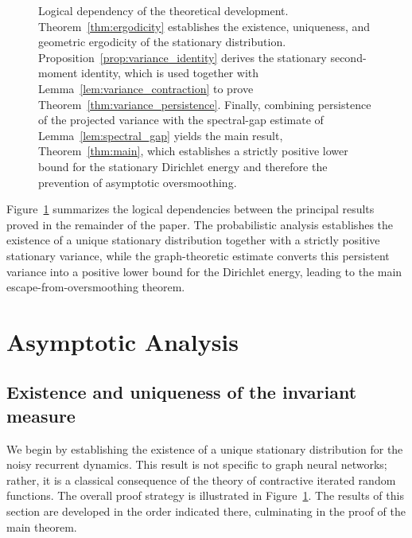 \documentclass{article}
\begin{document}
\begin{figure}
	\caption{
		Logical dependency of the theoretical development.
		Theorem~\ref{thm:ergodicity} establishes the existence, uniqueness, and
		geometric ergodicity of the stationary distribution.
		Proposition~\ref{prop:variance_identity} derives the stationary
		second-moment identity, which is used together with
		Lemma~\ref{lem:variance_contraction} to prove
		Theorem~\ref{thm:variance_persistence}.
		Finally, combining persistence of the projected variance with the
		spectral-gap estimate of
		Lemma~\ref{lem:spectral_gap}
		yields the main result,
		Theorem~\ref{thm:main}, which establishes a strictly positive lower bound
		for the stationary Dirichlet energy and therefore the prevention of
		asymptotic oversmoothing.
	}
	\label{fig:proof_structure}
	
\end{figure}

Figure~\ref{fig:proof_structure} summarizes the logical dependencies
between the principal results proved in the remainder of the paper.
The probabilistic analysis establishes the existence of a unique
stationary distribution together with a strictly positive stationary
variance, while the graph-theoretic estimate converts this persistent
variance into a positive lower bound for the Dirichlet energy, leading
to the main escape-from-oversmoothing theorem.

\section{Asymptotic Analysis}
\label{sec:Asymptotic_Analysis}

\subsection{Existence and uniqueness of the invariant measure}

We begin by establishing the existence of a unique stationary
distribution for the noisy recurrent dynamics.
This result is not specific to graph neural networks; rather, it is a
classical consequence of the theory of contractive iterated random
functions.
The overall proof strategy is illustrated in
Figure~\ref{fig:proof_structure}.
The results of this section are developed in the order indicated there,
culminating in the proof of the main theorem.
\end{document}
